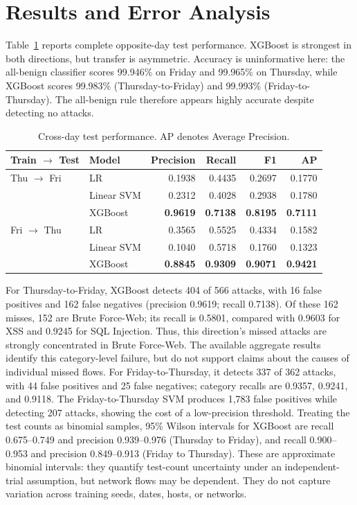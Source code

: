 \documentclass{article}
\begin{document}
\section{Results and Error Analysis}
Table~\ref{tab:main} reports complete opposite-day test performance. XGBoost is strongest in both directions, but transfer is asymmetric. Accuracy is uninformative here: the all-benign classifier scores 99.946\% on Friday and 99.965\% on Thursday, while XGBoost scores 99.983\% (Thursday-to-Friday) and 99.993\% (Friday-to-Thursday). The all-benign rule therefore appears highly accurate despite detecting no attacks.
\begin{table}[t]
\centering
\caption{Cross-day test performance. AP denotes Average Precision.}
\label{tab:main}
\begin{tabular}{llrrrr}
\toprule
Train $\rightarrow$ Test & Model & Precision & Recall & F1 & AP \\
\midrule
Thu $\rightarrow$ Fri & LR & 0.1938 & 0.4435 & 0.2697 & 0.1770 \\
 & Linear SVM & 0.2312 & 0.4028 & 0.2938 & 0.1780 \\
 & XGBoost & \textbf{0.9619} & \textbf{0.7138} & \textbf{0.8195} & \textbf{0.7111} \\
\midrule
Fri $\rightarrow$ Thu & LR & 0.3565 & 0.5525 & 0.4334 & 0.1582 \\
 & Linear SVM & 0.1040 & 0.5718 & 0.1760 & 0.1323 \\
 & XGBoost & \textbf{0.8845} & \textbf{0.9309} & \textbf{0.9071} & \textbf{0.9421} \\
\bottomrule
\end{tabular}
\end{table}

For Thursday-to-Friday, XGBoost detects 404 of 566 attacks, with 16 false positives and 162 false negatives (precision 0.9619; recall 0.7138). Of these 162 misses, 152 are Brute Force-Web; its recall is 0.5801, compared with 0.9603 for XSS and 0.9245 for SQL Injection. Thus, this direction's missed attacks are strongly concentrated in Brute Force-Web. The available aggregate results identify this category-level failure, but do not support claims about the causes of individual missed flows. For Friday-to-Thursday, it detects 337 of 362 attacks, with 44 false positives and 25 false negatives; category recalls are 0.9357, 0.9241, and 0.9118. The Friday-to-Thursday SVM produces 1,783 false positives while detecting 207 attacks, showing the cost of a low-precision threshold. Treating the test counts as binomial samples, 95\% Wilson intervals for XGBoost are recall 0.675--0.749 and precision 0.939--0.976 (Thursday to Friday), and recall 0.900--0.953 and precision 0.849--0.913 (Friday to Thursday). These are approximate binomial intervals: they quantify test-count uncertainty under an independent-trial assumption, but network flows may be dependent. They do not capture variation across training seeds, dates, hosts, or networks.
\end{document}
